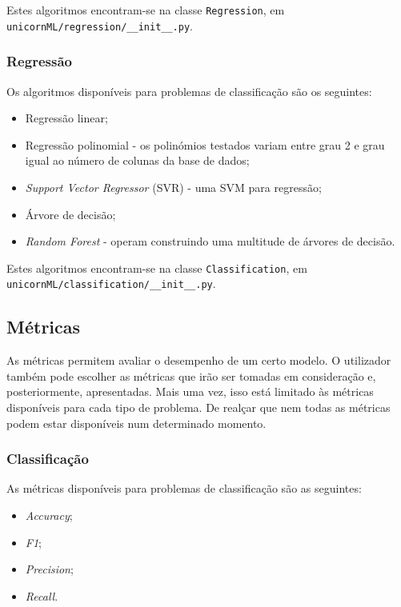\documentclass[a4paper]{report}
\begin{document}
{			Estes algoritmos encontram-se na classe \texttt{Regression}, em \texttt{unicornML/regression/\_\_init\_\_.py}.
            
			\subsubsection{Regressão} \label{sssec:Regression1}
			Os algoritmos disponíveis para problemas de classificação são os seguintes:
			\begin{itemize}
				\item Regressão linear;
				\item Regressão polinomial - os polinómios testados variam entre grau 2 e grau igual ao número de colunas da base de dados;
				\item \textit{Support Vector Regressor} (SVR) - uma SVM para regressão;
				\item Árvore de decisão;
				\item \textit{Random Forest} - operam construindo uma multitude de árvores de decisão.
			\end{itemize}

			Estes algoritmos encontram-se na classe \texttt{Classification}, em \texttt{unicornML/classification/\_\_init\_\_.py}.

		\subsection{Métricas} \label{subsec:Metrics}
		As métricas permitem avaliar o desempenho de um certo modelo. 
		O utilizador também pode escolher as métricas que irão ser tomadas em consideração e, posteriormente, apresentadas.
		Mais uma vez, isso está limitado às métricas disponíveis para cada tipo de problema.
		De realçar que nem todas as métricas podem estar disponíveis num determinado momento.

            \subsubsection{Classificação} \label{sssec:Classification2}
			As métricas disponíveis para problemas de classificação são as seguintes:
			\begin{itemize}
				\item \textit{Accuracy};
				\item \textit{F1};
				\item \textit{Precision};
				\item \textit{Recall}.
			\end{itemize}

}
\end{document}
